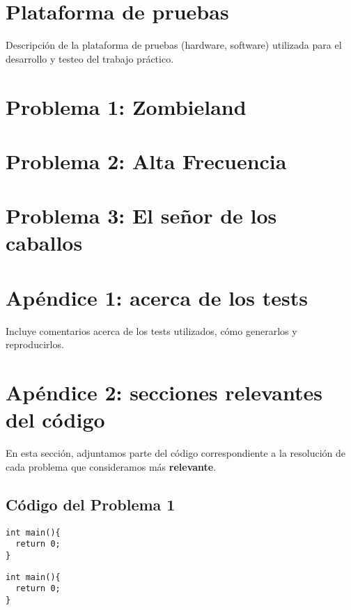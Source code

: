 \documentclass[a4paper]{article}
\begin{document}
\newpage
\section{Plataforma de pruebas}

Descripción de la plataforma de pruebas (hardware, software) utilizada
para el desarrollo y testeo del trabajo práctico.


\newpage
\section{Problema 1: Zombieland}


\newpage
\section{Problema 2: Alta Frecuencia}


\newpage
\section{Problema 3: El señor de los caballos}



\newpage
\section{Apéndice 1: acerca de los tests}

Incluye comentarios acerca de los tests utilizados, cómo generarlos y reproducirlos.


\newpage
\section{Apéndice 2: secciones relevantes del código}
En esta sección, adjuntamos parte del código correspondiente a la resolución de cada problema
que consideramos más \textbf{relevante}.

\subsection{Código del Problema 1}

\begin{lstlisting}
int main(){
  return 0;
}
\end{lstlisting}

\vspace*{0.5cm}

\begin{lstlisting}
int main(){
  return 0;
}
\end{lstlisting}
\end{document}
